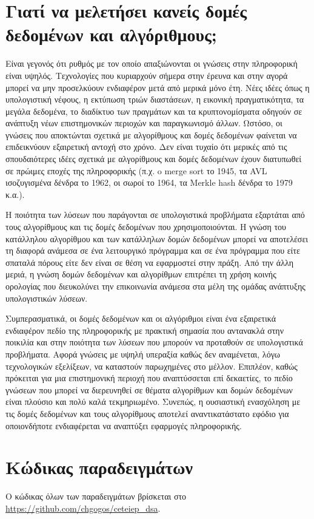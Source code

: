 \section*{Γιατί να μελετήσει κανείς δομές δεδομένων και αλγόριθμους;}
Είναι γεγονός ότι ρυθμός με τον οποίο απαξιώνονται οι γνώσεις στην πληροφορική είναι υψηλός. Τεχνολογίες που κυριαρχούν σήμερα στην έρευνα και στην αγορά μπορεί να μην προσελκύουν ενδιαφέρον μετά από μερικά μόνο έτη. Νέες ιδέες όπως η υπολογιστική νέφους, η εκτύπωση τριών διαστάσεων, η εικονική πραγματικότητα, τα μεγάλα δεδομένα, το διαδίκτυο των πραγμάτων και τα κρυπτονομίσματα οδηγούν σε ανάπτυξη νέων επιστημονικών περιοχών και παραγκωνισμό άλλων. Ωστόσο, οι γνώσεις που αποκτώνται σχετικά με αλγορίθμους και δομές δεδομένων φαίνεται να επιδεικνύουν εξαιρετική αντοχή στο χρόνο. Δεν είναι τυχαίο ότι μερικές από τις σπουδαιότερες ιδέες σχετικά με αλγορίθμους και δομές δεδομένων έχουν διατυπωθεί σε πρώιμες εποχές της πληροφορικής (π.χ. o merge sort το 1945, τα AVL ισοζυγισμένα δένδρα το 1962, οι σωροί το 1964, τα Merkle hash δένδρα το 1979 κ.α.).

Η ποιότητα των λύσεων που παράγονται σε υπολογιστικά προβλήματα εξαρτάται από τους αλγορίθμους και τις δομές δεδομένων που χρησιμοποιούνται. Η γνώση του κατάλληλου αλγορίθμου και των κατάλληλων δομών δεδομένων μπορεί να αποτελέσει τη διαφορά ανάμεσα σε ένα λειτουργικό πρόγραμμα και σε ένα πρόγραμμα που είτε σπαταλά πόρους είτε δεν είναι σε θέση να εφαρμοστεί στην πράξη. Από την άλλη μεριά, η γνώση δομών δεδομένων και αλγορίθμων επιτρέπει τη χρήση κοινής ορολογίας που διευκολύνει την επικοινωνία ανάμεσα στα μέλη της ομάδας ανάπτυξης υπολογιστικών λύσεων. 

Συμπερασματικά, οι δομές δεδομένων και οι αλγόριθμοι είναι ένα εξαιρετικά ενδιαφέρον πεδίο της πληροφορικής με πρακτική σημασία που αντανακλά στην ποικιλία και στην ποιότητα των λύσεων που μπορούν να προταθούν σε υπολογιστικά προβλήματα. Αφορά γνώσεις με υψηλή υπεραξία καθώς δεν αναμένεται, λόγω τεχνολογικών εξελίξεων, να καταστούν παρωχημένες στο μέλλον. Επιπλέον, καθώς πρόκειται για μια επιστημονική περιοχή που αναπτύσσεται επί δεκαετίες, το πεδίο γνώσεων που μπορεί να διερευνηθεί σε θέματα αλγορίθμων και δομών δεδομένων είναι πλούσιο και πολύ καλά τεκμηριωμένο. Συνεπώς, η ουσιαστική ενασχόληση με τις δομές δεδομένων και τους αλγορίθμους αποτελεί αναντικατάστατο εφόδιο για οποιονδήποτε ενδιαφέρεται να αναπτύξει εφαρμογές πληροφορικής. 

\section*{Κώδικας παραδειγμάτων}
Ο κώδικας όλων των παραδειγμάτων βρίσκεται στο \href{https://github.com/chgogos/ceteiep_dsa}{https://github.com/chgogos/ceteiep\_dsa}.
